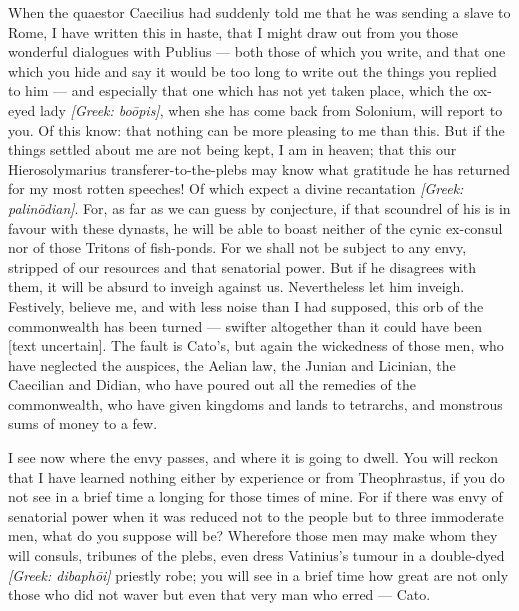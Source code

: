 

 When the quaestor Caecilius had suddenly told me that he was sending a slave to Rome, I have written this in haste, that I might draw out from you those wonderful dialogues with Publius --- both those of which you write, and that one which you hide and say it would be too long to write out the things you replied to him --- and especially that one which has not yet taken place, which the ox-eyed lady \textit{[Greek: bo\=opis]}, when she has come back from Solonium, will report to you. Of this know: that nothing can be more pleasing to me than this. But if the things settled about me are not being kept, I am in heaven; that this our Hierosolymarius transferer-to-the-plebs may know what gratitude he has returned for my most rotten speeches! Of which expect a divine recantation \textit{[Greek: palin\=odian]}. For, as far as we can guess by conjecture, if that scoundrel of his is in favour with these dynasts, he will be able to boast neither of the cynic ex-consul nor of those Tritons of fish-ponds. For we shall not be subject to any envy, stripped of our resources and that senatorial power. But if he disagrees with them, it will be absurd to inveigh against us. Nevertheless let him inveigh. Festively, believe me, and with less noise than I had supposed, this orb of the commonwealth has been turned --- swifter altogether than it could have been [text uncertain]. The fault is Cato's, but again the wickedness of those men, who have neglected the auspices, the Aelian law, the Junian and Licinian, the Caecilian and Didian, who have poured out all the remedies of the commonwealth, who have given kingdoms and lands to tetrarchs, and monstrous sums of money to a few.

 I see now where the envy passes, and where it is going to dwell. You will reckon that I have learned nothing either by experience or from Theophrastus, if you do not see in a brief time a longing for those times of mine. For if there was envy of senatorial power when it was reduced not to the people but to three immoderate men, what do you suppose will be? Wherefore those men may make whom they will consuls, tribunes of the plebs, even dress Vatinius's tumour in a double-dyed \textit{[Greek: dibaph\=oi]} priestly robe; you will see in a brief time how great are not only those who did not waver but even that very man who erred --- Cato.

